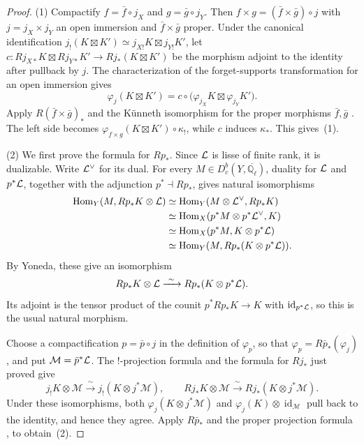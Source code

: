 \documentclass[12pt,reqno]{amsart}
\theoremstyle{definition}
\theoremstyle{plain}
\theoremstyle{definition}
\theoremstyle{remark}
\newcommand{\bbQ}{\mathbb{Q}}  \newcommand{\bbR}{\mathbb{R}}
\newcommand{\cM}{\mathcal{M}}  \newcommand{\cN}{\mathcal{N}}
\newcommand{\ol}[1]{\overline{#1}}
\newcommand{\Ql}{\bbQ_{\ell}}
\newcommand{\Db}{D^b_c}
\begin{document}
\begin{proof}
(1)  Compactify \(f=\bar f\circ j_X\) and \(g=\bar g\circ j_Y\).  Then
\(f\times g=(\bar f\times\bar g)\circ j\) with \(j=j_X\times j_Y\) an open immersion and
\(\bar f\times\bar g\) proper.  Under the canonical identification
\(j_!(K\boxtimes K')\simeq j_{X!}K\boxtimes j_{Y!}K'\), let
\(c\colon Rj_{X*}K\boxtimes Rj_{Y*}K'\to Rj_*(K\boxtimes K')\) be the morphism adjoint to the identity
after pullback by \(j\).  The characterization of the forget-supports transformation for an open
immersion gives
\[
 \varphi_j(K\boxtimes K')
 =c\circ\bigl(\varphi_{j_X}K\boxtimes\varphi_{j_Y}K'\bigr).
\]
Apply \(R(\bar f\times\bar g)_*\) and the K\"unneth isomorphism for the proper morphisms
\(\bar f,\bar g\) \cite[Exp.~XVII, Th.~5.4.3]{SGA4}.  The left side becomes
\(\varphi_{f\times g}(K\boxtimes K')\circ\kappa_!\), while \(c\) induces \(\kappa_*\).  This gives~(1).

(2)  We first prove the formula for \(Rp_*\).  Since \(\mathcal{L}\) is lisse of finite rank, it is dualizable.
Write \(\mathcal{L}^\vee\) for its dual.  For every \(M\in\Db(Y,\ol\Ql)\), duality for \(\mathcal{L}\) and
\(p^*\mathcal{L}\), together with the adjunction \(p^*\dashv Rp_*\), gives natural isomorphisms
\[
\begin{aligned}
 \operatorname{Hom}_Y(M,Rp_*K\otimes\mathcal{L})
 &\simeq \operatorname{Hom}_Y(M\otimes\mathcal{L}^\vee,Rp_*K)\\
 &\simeq \operatorname{Hom}_X(p^*M\otimes p^*\mathcal{L}^\vee,K)\\
 &\simeq \operatorname{Hom}_X(p^*M,K\otimes p^*\mathcal{L})\\
 &\simeq \operatorname{Hom}_Y(M,Rp_*(K\otimes p^*\mathcal{L})).
\end{aligned}
\]
By Yoneda, these give an isomorphism
\[
        Rp_*K\otimes\cL\xrightarrow{\ \sim\ }Rp_*(K\otimes p^*\cL).
\]
Its adjoint is the tensor product of the counit \(p^*Rp_*K\to K\) with
\(\operatorname{id}_{p^*\mathcal{L}}\), so this is the usual natural morphism.

Choose a compactification \(p=\bar p\circ j\) in the definition of \(\varphi_p\), so that
\(\varphi_p=R\bar p_*(\varphi_j)\), and put \(\cM=\bar p^*\cL\).  The \(!\)-projection formula and the
formula for \(Rj_*\) just proved give
\[
 j_!K\otimes\cM\xrightarrow{\ \sim\ }j_!(K\otimes j^*\cM),
 \qquad
 Rj_*K\otimes\cM\xrightarrow{\ \sim\ }Rj_*(K\otimes j^*\cM).
\]
Under these isomorphisms, both \(\varphi_j(K\otimes j^*\cM)\) and
\(\varphi_j(K)\otimes\operatorname{id}_{\cM}\) pull back to the identity, and hence they agree.  Apply
\(R\bar p_*\) and the proper projection formula \cite[Exp.~XVII, Prop.~5.2.9]{SGA4},
\cite[Prop.~A.1.5(ii)]{GabberLoeser1996} to obtain~(2).
\end{proof}
\end{document}
